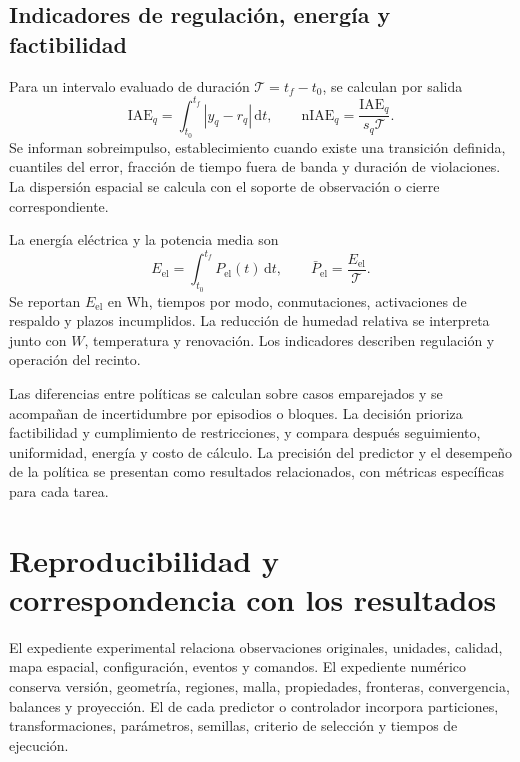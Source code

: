 \subsection{Indicadores de regulación, energía y factibilidad}

Para un intervalo evaluado de duración $\mathcal T=t_f-t_0$, se calculan por salida
\begin{equation}
\mathrm{IAE}_q=\int_{t_0}^{t_f}|y_q-r_q|\,\mathrm dt,\qquad
\mathrm{nIAE}_q=\frac{\mathrm{IAE}_q}{s_q\mathcal T}.
\label{met:iae_control}
\end{equation}
Se informan sobreimpulso, establecimiento cuando existe una transición definida, cuantiles del error, fracción de tiempo fuera de banda y duración de violaciones. La dispersión espacial se calcula con el soporte de observación o cierre correspondiente.

La energía eléctrica y la potencia media son
\begin{equation}
E_{\mathrm{el}}=\int_{t_0}^{t_f}P_{\mathrm{el}}(t)\,\mathrm dt,\qquad
\bar P_{\mathrm{el}}=\frac{E_{\mathrm{el}}}{\mathcal T}.
\label{met:energia_control}
\end{equation}
Se reportan $E_{\mathrm{el}}$ en Wh, tiempos por modo, conmutaciones, activaciones de respaldo y plazos incumplidos. La reducción de humedad relativa se interpreta junto con $W$, temperatura y renovación. Los indicadores describen regulación y operación del recinto.

Las diferencias entre políticas se calculan sobre casos emparejados y se acompañan de incertidumbre por episodios o bloques. La decisión prioriza factibilidad y cumplimiento de restricciones, y compara después seguimiento, uniformidad, energía y costo de cálculo. La precisión del predictor y el desempeño de la política se presentan como resultados relacionados, con métricas específicas para cada tarea.
\FloatBarrier

\section{Reproducibilidad y correspondencia con los resultados}
\label{met:reproducibilidad}

El expediente experimental relaciona observaciones originales, unidades, calidad, mapa espacial, configuración, eventos y comandos. El expediente numérico conserva versión, geometría, regiones, malla, propiedades, fronteras, convergencia, balances y proyección. El de cada predictor o controlador incorpora particiones, transformaciones, parámetros, semillas, criterio de selección y tiempos de ejecución.

